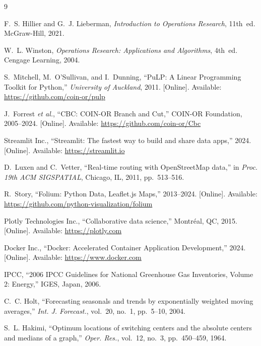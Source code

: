 \documentclass[conference]{IEEEtran}
\begin{document}
\begin{thebibliography}{9}

F.~S. Hillier and G.~J. Lieberman,
\textit{Introduction to Operations Research}, 11th~ed.
McGraw-Hill, 2021.

W.~L. Winston,
\textit{Operations Research: Applications and Algorithms}, 4th~ed.
Cengage Learning, 2004.

S.~Mitchell, M.~O'Sullivan, and I.~Dunning,
``PuLP: A Linear Programming Toolkit for Python,''
\textit{University of Auckland}, 2011.
[Online]. Available: \url{https://github.com/coin-or/pulp}

J.~Forrest \textit{et al.},
``CBC: COIN-OR Branch and Cut,''
COIN-OR Foundation, 2005--2024.
[Online]. Available: \url{https://github.com/coin-or/Cbc}

Streamlit Inc.,
``Streamlit: The fastest way to build and share data apps,''
2024. [Online]. Available: \url{https://streamlit.io}

D.~Luxen and C.~Vetter,
``Real-time routing with OpenStreetMap data,''
in \textit{Proc. 19th ACM SIGSPATIAL}, Chicago, IL, 2011, pp.~513--516.

R.~Story,
``Folium: Python Data, Leaflet.js Maps,''
2013--2024. [Online]. Available: \url{https://github.com/python-visualization/folium}

Plotly Technologies Inc.,
``Collaborative data science,''
Montr\'{e}al, QC, 2015. [Online]. Available: \url{https://plotly.com}

Docker Inc.,
``Docker: Accelerated Container Application Development,''
2024. [Online]. Available: \url{https://www.docker.com}

IPCC,
``2006 IPCC Guidelines for National Greenhouse Gas Inventories,
Volume 2: Energy,'' IGES, Japan, 2006.

C.~C. Holt,
``Forecasting seasonals and trends by exponentially weighted moving averages,''
\textit{Int. J. Forecast.}, vol.~20, no.~1, pp.~5--10, 2004.

S.~L. Hakimi,
``Optimum locations of switching centers and the absolute centers and medians
of a graph,''
\textit{Oper. Res.}, vol.~12, no.~3, pp.~450--459, 1964.

\end{thebibliography}
\end{document}
